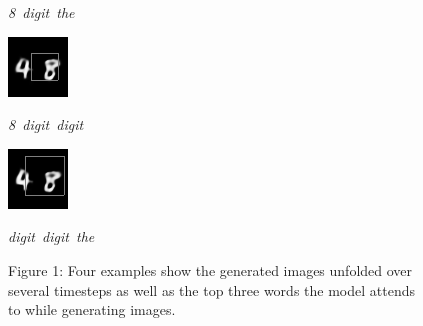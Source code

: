 \documentclass{article} %
\begin{document}
\begin{figure}[t]
  \caption{\mbox{\textit{8 digit the}}}
\endminipage\hfill
{}
  \includegraphics[width=\linewidth]{figures/4-8-25.png}
  \caption{\mbox{\textit{8 digit digit}}}
\endminipage\hfill
{}
  \includegraphics[width=\linewidth]{figures/4-8-28.png}
  \caption{\mbox{\textit{digit digit the}}}
\endminipage\hfill

\captionsetup{labelformat=empty}
\caption{Figure 1: Four examples show the generated images unfolded over several timesteps as well as the top three words the model attends to while generating images.}
\end{figure}



\end{document}

